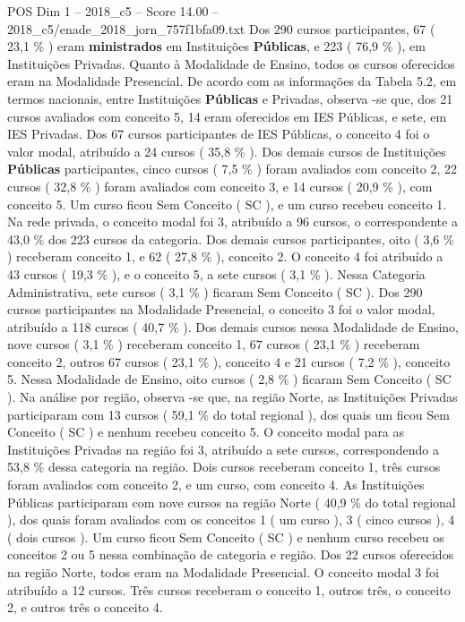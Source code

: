 \begin{textsample}{POS Dim 1 – 2018\_c5 – Score 14.00 – 2018\_c5/enade\_2018\_jorn\_757f1bfa09.txt}
Dos 290 cursos participantes, 67 ( 23,1 \% ) eram \textbf{ministrados} em Instituições \textbf{Públicas}, e 223 ( 76,9 \% ), em Instituições Privadas.
Quanto à Modalidade de Ensino, todos os cursos oferecidos eram na Modalidade Presencial.
De acordo com as informações da Tabela 5.2, em termos nacionais, entre Instituições \textbf{Públicas} e Privadas, observa -se que, dos 21 cursos avaliados com conceito 5, 14 eram oferecidos em IES Públicas, e sete, em IES Privadas.
Dos 67 cursos participantes de IES Públicas, o conceito 4 foi o valor modal, atribuído a 24 cursos ( 35,8 \% ).
Dos demais cursos de Instituições \textbf{Públicas} participantes, cinco cursos ( 7,5 \% ) foram avaliados com conceito 2, 22 cursos ( 32,8 \% ) foram avaliados com conceito 3, e 14 cursos ( 20,9 \% ), com conceito 5.
Um curso ficou Sem Conceito ( SC ), e um curso recebeu conceito 1.
Na rede privada, o conceito modal foi 3, atribuído a 96 cursos, o correspondente a 43,0 \% dos 223 cursos da categoria.
Dos demais cursos participantes, oito ( 3,6 \% ) receberam conceito 1, e 62 ( 27,8 \% ), conceito 2.
O conceito 4 foi atribuído a 43 cursos ( 19,3 \% ), e o conceito 5, a sete cursos ( 3,1 \% ).
Nessa Categoria Administrativa, sete cursos ( 3,1 \% ) ficaram Sem Conceito ( SC ).
Dos 290 cursos participantes na Modalidade Presencial, o conceito 3 foi o valor modal, atribuído a 118 cursos ( 40,7 \% ).
Dos demais cursos nessa Modalidade de Ensino, nove cursos ( 3,1 \% ) receberam conceito 1, 67 cursos ( 23,1 \% ) receberam conceito 2, outros 67 cursos ( 23,1 \% ), conceito 4 e 21 cursos ( 7,2 \% ), conceito 5.
Nessa Modalidade de Ensino, oito cursos ( 2,8 \% ) ficaram Sem Conceito ( SC ).
Na análise por região, observa -se que, na região Norte, as Instituições Privadas participaram com 13 cursos ( 59,1 \% do total regional ), dos quais um ficou Sem Conceito ( SC ) e nenhum recebeu conceito 5.
O conceito modal para as Instituições Privadas na região foi 3, atribuído a sete cursos, correspondendo a 53,8 \% dessa categoria na região.
Dois cursos receberam conceito 1, três cursos foram avaliados com conceito 2, e um curso, com conceito 4.
As Instituições Públicas participaram com nove cursos na região Norte ( 40,9 \% do total regional ), dos quais foram avaliados com os conceitos 1 ( um curso ), 3 ( cinco cursos ), 4 ( dois cursos ).
Um curso ficou Sem Conceito ( SC ) e nenhum curso recebeu os conceitos 2 ou 5 nessa combinação de categoria e região.
Dos 22 cursos oferecidos na região Norte, todos eram na Modalidade Presencial.
O conceito modal 3 foi atribuído a 12 cursos.
Três cursos receberam o conceito 1, outros três, o conceito 2, e outros três o conceito 4.

\end{textsample}
